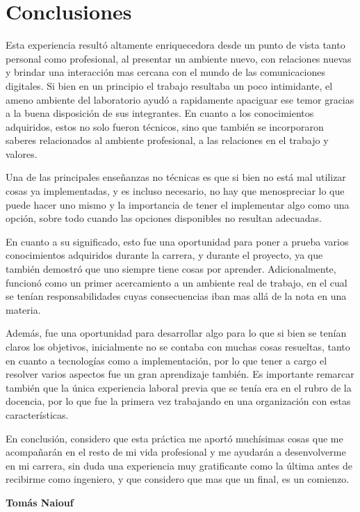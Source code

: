 \documentclass[a4paper,10pt]{article}
\begin{document}
\section{Conclusiones}
Esta experiencia resultó altamente enriquecedora desde un punto de vista tanto personal como profesional, al presentar un ambiente nuevo, con relaciones nuevas y brindar una interacción mas cercana con el mundo de las comunicaciones digitales. 
Si bien en un principio el trabajo resultaba un poco intimidante, el ameno ambiente del laboratorio ayudó a rapidamente apaciguar ese temor gracias a la buena disposición de sus integrantes. En cuanto a los conocimientos adquiridos, estos no solo fueron técnicos, sino que 
también se incorporaron saberes relacionados al ambiente profesional, a las relaciones en el trabajo y valores. 
\par
Una de las principales enseñanzas no técnicas es que si bien no está mal utilizar cosas ya implementadas, y es incluso necesario, no hay que menospreciar lo que
puede hacer uno mismo y la importancia de tener el implementar algo como una opción, sobre todo cuando las opciones disponibles no resultan adecuadas.
\par
En cuanto a su significado, esto fue una oportunidad para poner a prueba varios conocimientos adquiridos durante la carrera, y  durante el proyecto, ya que también demostró que uno siempre tiene cosas por aprender. Adicionalmente, funcionó como un primer 
acercamiento a un ambiente real de trabajo, en el cual se tenían responsabilidades cuyas consecuencias iban mas allá de la nota en una materia. 
\par
Además, fue una oportunidad para desarrollar algo para lo que si bien se tenían claros los objetivos, inicialmente no se contaba con
muchas cosas resueltas, tanto en cuanto a tecnologías como a implementación, por lo que tener a cargo el resolver varios aspectos fue un gran aprendizaje también. Es importante remarcar también que la única experiencia laboral previa que se tenía era en el rubro de la docencia, por lo que fue la primera vez trabajando en una organización con estas características.
\par
En conclusión, considero que esta práctica me aportó muchísimas cosas que me acompañarán en el resto de mi vida profesional y me ayudarán a desenvolverme en mi carrera, sin duda una experiencia muy gratificante como la última antes de recibirme como ingeniero, y que 
considero que mas que un final, es un comienzo.

\begin{flushright}
\begin{figure}[H]
\centering
{}
\raggedleft 
\end{figure}
\textbf{Tomás Naiouf}
\end{flushright}
\end{document}

